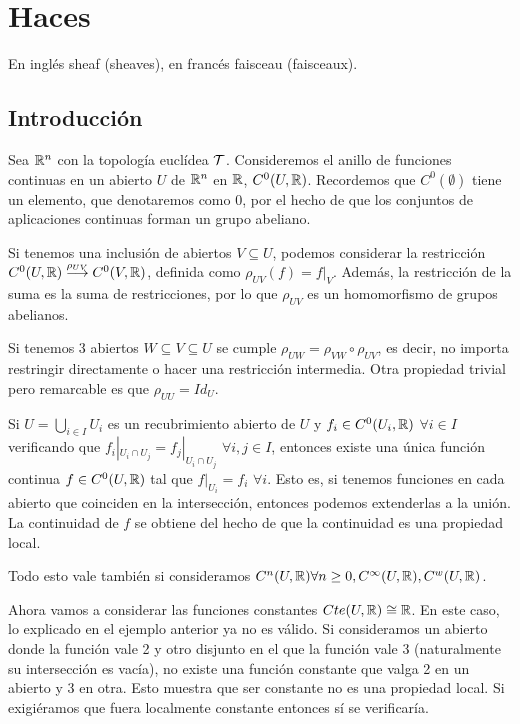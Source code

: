 \documentclass[GA.tex]{subfiles}
\begin{document}

\chapter{Haces}
En inglés sheaf (sheaves), en francés faisceau (faisceaux).

\section{Introducción}

\begin{ej}
Sea $\mathbb{R}^n$ con la topología euclídea $\mathcal{T}$. Consideremos el anillo de funciones continuas en un abierto $U$ de $\mathbb{R}^n$ en $\mathbb{R}$, $C^0(U,\mathbb{R})$. Recordemos que $C^0(\emptyset)$ tiene un elemento, que denotaremos como $0$, por el hecho de que los conjuntos de aplicaciones continuas forman un grupo abeliano. 

Si tenemos una inclusión de abiertos $V\subseteq U$, podemos considerar la restricción $C^0(U,\mathbb{R})\overset{\rho_{UV}}{\longrightarrow} C^0(V,\mathbb{R})$, definida como $\rho_{UV}(f)=f|_V$. Además, la restricción de la suma es la suma de restricciones, por lo que $\rho_{UV}$ es un homomorfismo de grupos abelianos. 

Si tenemos 3 abiertos $W\subseteq V\subseteq U$ se cumple $\rho_{UW}=\rho_{VW}\circ\rho_{UV}$, es decir, no importa restringir directamente o hacer una restricción intermedia. Otra propiedad trivial pero remarcable es que $\rho_{UU}=Id_U$. 


Si $U=\bigcup_{i\in I} U_i$ es un recubrimiento abierto de $U$ y $f_i\in C^0(U_i,\mathbb{R})$ $\forall i\in I$ verificando que $f_i|_{U_i\cap U_j}=f_j|_{U_i\cap U_j}$ $\forall i,j\in I$, entonces existe una única función continua $f\in C^0(U,\mathbb{R})$ tal que $f|_{U_i}=f_i$ $\forall i$. Esto es, si tenemos funciones en cada abierto que coinciden en la intersección, entonces podemos extenderlas a la unión. La continuidad de $f$ se obtiene del hecho de que la continuidad es una propiedad local. 

Todo esto vale también si consideramos $C^n(U,\mathbb{R})\forall n\geq 0, C^\infty(U,\mathbb{R}), C^w(U,\mathbb{R})$.
\end{ej}

\begin{ej}
Ahora vamos a considerar las funciones constantes $Cte(U,\mathbb{R})\cong \mathbb{R}$. En este caso, lo explicado en el ejemplo anterior ya no es válido. Si consideramos un abierto donde la función vale 2 y otro disjunto en el que la función vale 3 (naturalmente su intersección es vacía), no existe una función constante que valga 2 en un abierto y 3 en otra. Esto muestra que ser constante no es una propiedad local. Si exigiéramos que fuera localmente constante entonces sí se verificaría.
\end{ej}
\end{document}
